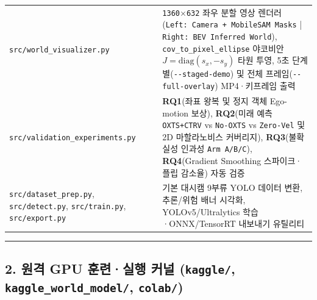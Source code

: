 \documentclass[10.5pt,a4paper]{article}
\begin{document}
\begin{footnotesize}
\begin{longtable}{>{\raggedright\arraybackslash}p{} >{\raggedright\arraybackslash}p{} >{\raggedright\arraybackslash}p{}}
\texttt{src/\allowbreak{}world\_\allowbreak{}visualizer.\allowbreak{}py} & 710 & \texttt{1360$\times$632} 좌우 분할 영상 렌더러 (\texttt{Left:\allowbreak{} Camera + MobileSAM Masks} | \texttt{Right:\allowbreak{} BEV Inferred World}), \texttt{cov\_\allowbreak{}to\_\allowbreak{}pixel\_\allowbreak{}ellipse} 야코비안 $J=\text{diag}(s_x,-s_y)$ 타원 투영, 5초 단계별(\texttt{-\allowbreak{}-\allowbreak{}staged-\allowbreak{}demo}) 및 전체 프레임(\texttt{-\allowbreak{}-\allowbreak{}full-\allowbreak{}overlay}) MP4·키프레임 출력 \\
\texttt{src/\allowbreak{}validation\_\allowbreak{}experiments.\allowbreak{}py} & 499 & \textbf{RQ1}(좌표 왕복 및 정지 객체 Ego-motion 보상), \textbf{RQ2}(미래 예측 \texttt{OXTS+CTRV} vs \texttt{No-\allowbreak{}OXTS} vs \texttt{Zero-\allowbreak{}Vel} 및 2D 마할라노비스 커버리지), \textbf{RQ3}(불확실성 인과성 \texttt{Arm A/\allowbreak{}B/\allowbreak{}C}), \textbf{RQ4}(Gradient Smoothing 스파이크·플립 감소율) 자동 검증 \\
\texttt{src/\allowbreak{}dataset\_\allowbreak{}prep.\allowbreak{}py}, \texttt{src/\allowbreak{}detect.\allowbreak{}py}, \texttt{src/\allowbreak{}train.\allowbreak{}py}, \texttt{src/\allowbreak{}export.\allowbreak{}py} & 377 & 기본 대시캠 9부류 YOLO 데이터 변환, 추론/위험 배너 시각화, YOLOv5/Ultralytics 학습·ONNX/TensorRT 내보내기 유틸리티 \\
\end{longtable}
\end{footnotesize}


\par\noindent\rule{\textwidth}{0.4pt}\par\medskip

\subsection{2. 원격 GPU 훈련·실행 커널 (\texttt{kaggle/\allowbreak{}}, \texttt{kaggle\_\allowbreak{}world\_\allowbreak{}model/\allowbreak{}}, \texttt{colab/\allowbreak{}})}
\end{document}
